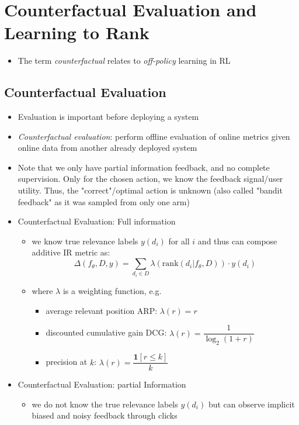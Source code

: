 \section{Counterfactual Evaluation and Learning to Rank}
\begin{itemize}
	\item The term \textit{counterfactual} relates to \textit{off-policy} learning in RL
\end{itemize}
\subsection{Counterfactual Evaluation}
\begin{itemize}
	\item Evaluation is important before deploying a system
	\item \textit{Counterfactual evaluation}: perform offline evaluation of online metrics given online data from another already deployed system
	\item Note that we only have partial information feedback, and no complete supervision. Only for the chosen action, we know the feedback signal/user utility. Thus, the "correct"/optimal action is unknown (also called "bandit feedback" as it was sampled from only one arm)
	\item Counterfactual Evaluation: Full information
	\begin{itemize}
		\item we know true relevance labels $y(d_i)$ for all $i$ and thus can compose additive IR metric as:
		$$ \Delta(f_\theta, D, y) = \sum_{d_i \in D} \lambda (\mathrm{rank}(d_i | f_\theta, D)) \cdot y(d_i) $$
		\item where $\lambda$ is a weighting function, e.g.
		\begin{itemize}
			\item average relevant position ARP: $\lambda(r) = r$
			\item discounted cumulative gain DCG: $\lambda(r) = \dfrac{1}{\log_2 (1 + r)}$
			\item precision at $k$: $\lambda(r) = \dfrac{\mathbf{1} [r \leq k]}{k}$
		\end{itemize}
	\end{itemize}
	\item Counterfactual Evaluation: partial Information
	\begin{itemize}
		\item we do not know the true relevance labels $y(d_i)$ but can observe implicit biased and noisy feedback through clicks

\end{itemize}
\end{itemize}

